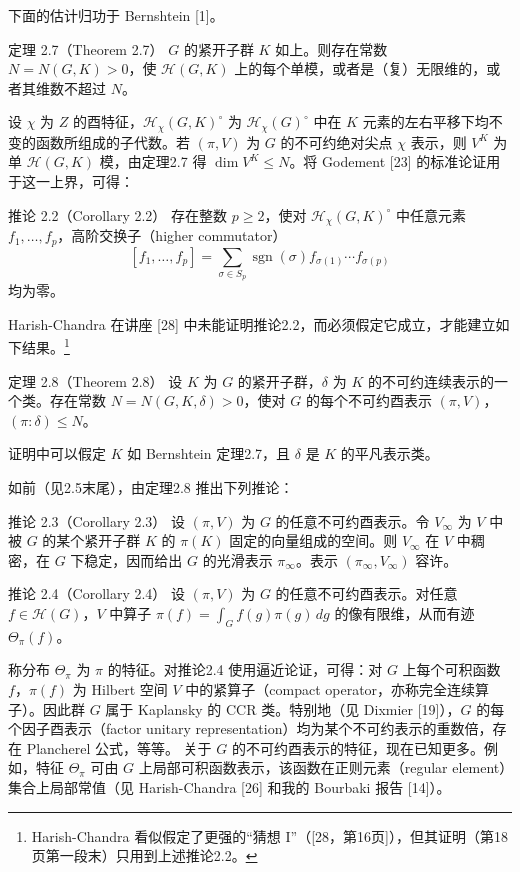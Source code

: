 下面的估计归功于 Bernshtein [1]。
\begin{originaltheorem}{定理 2.7（Theorem 2.7）}
$G$ 的紧开子群 $K$ 如上。则存在常数 $N=N(G,K)>0$，使 $\mathcal H(G,K)$ 上的每个单模，或者是（复）无限维的，或者其维数不超过 $N$。
\end{originaltheorem}
设 $\chi$ 为 $Z$ 的酉特征，$\mathcal H_\chi(G,K)^\circ$ 为 $\mathcal H_\chi(G)^\circ$ 中在 $K$ 元素的左右平移下均不变的函数所组成的子代数。若 $(\pi,V)$ 为 $G$ 的不可约绝对尖点 $\chi$ 表示，则 $V^K$ 为单 $\mathcal H(G,K)$ 模，由定理2.7 得 $\dim V^K\leq N$。将 Godement [23] 的标准论证用于这一上界，可得：
\begin{originaltheorem}{推论 2.2（Corollary 2.2）}
存在整数 $p\geq2$，使对 $\mathcal H_\chi(G,K)^\circ$ 中任意元素 $f_1,\ldots,f_p$，高阶交换子（higher commutator）
\[
[f_1,\ldots,f_p]=\sum_{\sigma\in S_p}\operatorname{sgn}(\sigma)f_{\sigma(1)}\cdots f_{\sigma(p)}\tag{10}
\]
均为零。
\end{originaltheorem}
Harish-Chandra 在讲座 [28] 中未能证明推论2.2，而必须假定它成立，才能建立如下结果。\footnote{Harish-Chandra 看似假定了更强的“猜想 I”（[28，第16页]），但其证明（第18页第一段末）只用到上述推论2.2。}
\begin{originaltheorem}{定理 2.8（Theorem 2.8）}
设 $K$ 为 $G$ 的紧开子群，$\delta$ 为 $K$ 的不可约连续表示的一个类。存在常数 $N=N(G,K,\delta)>0$，使对 $G$ 的每个不可约酉表示 $(\pi,V)$，$(\pi:\delta)\leq N$。
\end{originaltheorem}
证明中可以假定 $K$ 如 Bernshtein 定理2.7，且 $\delta$ 是 $K$ 的平凡表示类。

如前（见2.5末尾），由定理2.8 推出下列推论：
\begin{originaltheorem}{推论 2.3（Corollary 2.3）}
设 $(\pi,V)$ 为 $G$ 的任意不可约酉表示。令 $V_\infty$ 为 $V$ 中被 $G$ 的某个紧开子群 $K$ 的 $\pi(K)$ 固定的向量组成的空间。则 $V_\infty$ 在 $V$ 中稠密，在 $G$ 下稳定，因而给出 $G$ 的光滑表示 $\pi_\infty$。表示 $(\pi_\infty,V_\infty)$ 容许。
\end{originaltheorem}
\begin{originaltheorem}{推论 2.4（Corollary 2.4）}
设 $(\pi,V)$ 为 $G$ 的任意不可约酉表示。对任意 $f\in\mathcal H(G)$，$V$ 中算子 $\pi(f)=\int_Gf(g)\pi(g)\,dg$ 的像有限维，从而有迹 $\Theta_\pi(f)$。
\end{originaltheorem}
称分布 $\Theta_\pi$ 为 $\pi$ 的特征。对推论2.4 使用逼近论证，可得：对 $G$ 上每个可积函数 $f$，$\pi(f)$ 为 Hilbert 空间 $V$ 中的紧算子（compact operator，亦称完全连续算子）。因此群 $G$ 属于 Kaplansky 的 CCR 类。特别地（见 Dixmier [19]），$G$ 的每个因子酉表示（factor unitary representation）均为某个不可约表示的重数倍，存在 Plancherel 公式，等等。
关于 $G$ 的不可约酉表示的特征，现在已知更多。例如，特征 $\Theta_\pi$ 可由 $G$ 上局部可积函数表示，该函数在正则元素（regular element）集合上局部常值（见 Harish-Chandra [26] 和我的 Bourbaki 报告 [14]）。

